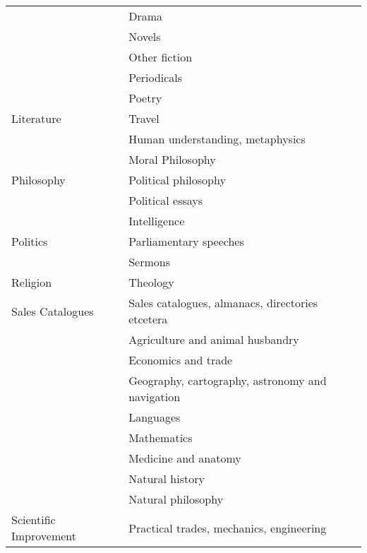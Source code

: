 \documentclass[
]{article}
\begin{document}
\begin{table}
\begin{tabular}[t]{ll}
 & Drama\\

 & Novels\\

 & Other fiction\\

 & Periodicals\\

 & Poetry\\

\multirow{-9}{*}{\raggedright\arraybackslash Literature} & Travel\\
\cmidrule{1-2}
 & Human understanding, metaphysics\\

 & Moral Philosophy\\

\multirow{-3}{*}{\raggedright\arraybackslash Philosophy} & Political philosophy\\
\cmidrule{1-2}
 & Political essays\\

 & Intelligence\\

\multirow{-3}{*}{\raggedright\arraybackslash Politics} & Parliamentary speeches\\
\cmidrule{1-2}
 & Sermons\\

\multirow{-2}{*}{\raggedright\arraybackslash Religion} & Theology\\
\cmidrule{1-2}
Sales Catalogues & Sales catalogues, almanacs, directories etcetera\\
\cmidrule{1-2}
 & Agriculture and animal husbandry\\

 & Economics and trade\\

 & Geography, cartography, astronomy and navigation\\

 & Languages\\

 & Mathematics\\

 & Medicine and anatomy\\

 & Natural history\\

 & Natural philosophy\\

\multirow{-9}{*}{\raggedright\arraybackslash Scientific Improvement} & Practical trades, mechanics, engineering\\
\bottomrule
\end{tabular}
\end{table}
\end{document}
